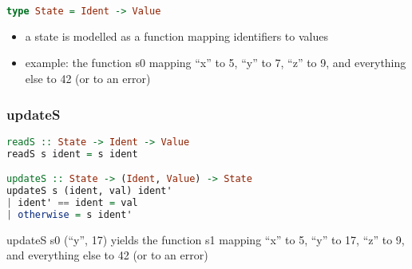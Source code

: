 \begin{lstlisting}[language=Haskell]
type State = Ident -> Value
\end{lstlisting}

\begin{itemize}
\tightlist
\item
  a state is modelled as a function mapping identifiers to values
\item
  example: the function s0 mapping ``x'' to 5, ``y'' to 7, ``z'' to 9,
  and everything else to 42 (or to an error)
\end{itemize}

\clearpage
\hypertarget{updates}{%
\subsubsection{updateS}\label{updates}}

\begin{lstlisting}[language=Haskell]
readS :: State -> Ident -> Value
readS s ident = s ident

updateS :: State -> (Ident, Value) -> State
updateS s (ident, val) ident'
| ident' == ident = val
| otherwise = s ident'
\end{lstlisting}

updateS s0 (``y'', 17) yields the function s1 mapping ``x'' to 5, ``y''
to 17, ``z'' to 9, and everything else to 42 (or to an error)

\clearpage